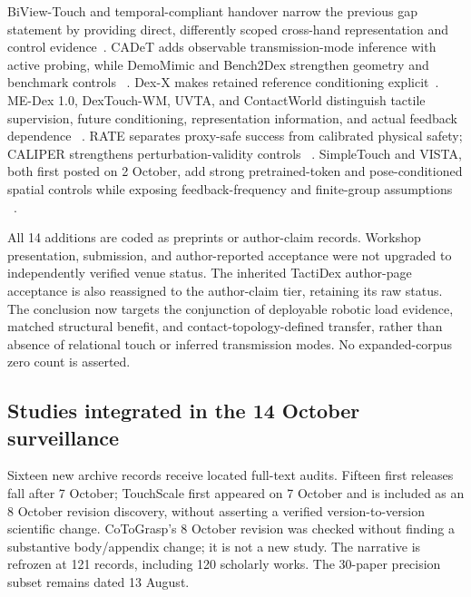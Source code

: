 BiView-Touch and temporal-compliant handover narrow the previous gap statement
by providing direct, differently scoped cross-hand representation and control
evidence~\cite{liang2026biviewtouch,marra2026temporaltactilehandover}. CADeT adds
observable transmission-mode inference with active probing, while DemoMimic and
Bench2Dex strengthen geometry and benchmark controls
~\cite{hu2026cadet,sharma2026demomimic,yang2026bench2dex}. Dex-X makes retained
reference conditioning explicit~\cite{chen2026dexx}. ME-Dex 1.0, DexTouch-WM,
UVTA, and ContactWorld distinguish tactile supervision, future conditioning,
representation information, and actual feedback dependence
~\cite{zhang2026medex,qin2026dextouchwm,li2026uvta,zhang2026contactworld}.
RATE separates proxy-safe success from calibrated physical safety; CALIPER
strengthens perturbation-validity controls
~\cite{jiang2026rate,mehta2026caliper}. SimpleTouch and VISTA, both first posted
on 2 October, add strong pretrained-token and pose-conditioned spatial controls
while exposing feedback-frequency and finite-group assumptions
~\cite{yang2026simpletouch,wong2026vista}.

All 14 additions are coded as preprints or author-claim records. Workshop
presentation, submission, and author-reported acceptance were not upgraded to
independently verified venue status. The inherited TactiDex author-page
acceptance is also reassigned to the author-claim tier, retaining its raw status. The conclusion now targets the conjunction
of deployable robotic load evidence, matched structural benefit, and
contact-topology-defined transfer, rather than absence of relational touch or
inferred transmission modes. No expanded-corpus zero count is asserted.

\subsection{Studies integrated in the 14 October surveillance}

Sixteen new archive records receive located full-text audits. Fifteen first
releases fall after 7 October; TouchScale first appeared on 7 October and is
included as an 8 October revision discovery, without asserting a verified
version-to-version scientific change. CoToGrasp's 8 October revision was checked
without finding a substantive body/appendix change; it is not a new study.
The narrative is refrozen at 121 records, including 120 scholarly works. The
30-paper precision subset remains dated 13 August.

